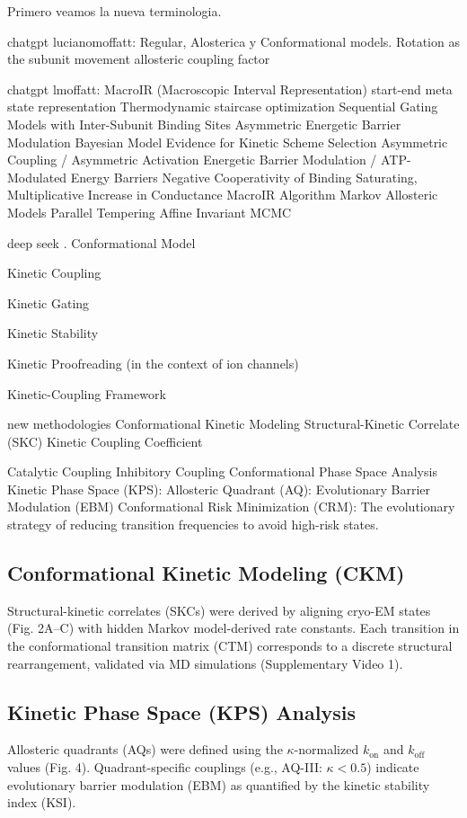 \documentclass[a4paper,12pt]{article}
\begin{document}
		
		Primero veamos la nueva terminologia. 
		
		chatgpt lucianomoffatt: 
		Regular, Alosterica y Conformational models. 
		Rotation as the subunit movement
		allosteric coupling factor
		
		chatgpt lmoffatt:
		MacroIR (Macroscopic Interval Representation)
		start-end meta state representation
		Thermodynamic staircase optimization
		Sequential Gating Models with Inter-Subunit Binding Sites
		Asymmetric Energetic Barrier Modulation
		Bayesian Model Evidence for Kinetic Scheme Selection
		Asymmetric Coupling / Asymmetric Activation
		Energetic Barrier Modulation / ATP-Modulated Energy Barriers
		Negative Cooperativity of Binding
		Saturating, Multiplicative Increase in Conductance
		MacroIR Algorithm
		Markov Allosteric Models
		Parallel Tempering Affine Invariant MCMC
		
		deep seek
		. Conformational Model
		
		Kinetic Coupling
		
		Kinetic Gating
		
		Kinetic Stability
		
		Kinetic Proofreading (in the context of ion channels)
		
		Kinetic-Coupling Framework
		
		
		new methodologies
		Conformational Kinetic Modeling
		Structural-Kinetic Correlate (SKC)
		Kinetic Coupling Coefficient 
		
		Catalytic Coupling
		Inhibitory Coupling
		Conformational Phase Space Analysis
		Kinetic Phase Space (KPS):
		Allosteric Quadrant (AQ):
		Evolutionary Barrier Modulation (EBM)
		Conformational Risk Minimization (CRM): The evolutionary strategy of reducing transition frequencies to avoid high-risk states.
		
		\subsection*{Conformational Kinetic Modeling (CKM)}  
		Structural-kinetic correlates (SKCs) were derived by aligning cryo-EM states (Fig. 2A–C) with hidden Markov model-derived rate constants. Each transition in the conformational transition matrix (CTM) corresponds to a discrete structural rearrangement, validated via MD simulations (Supplementary Video 1).  
		
		\subsection*{Kinetic Phase Space (KPS) Analysis}  
		Allosteric quadrants (AQs) were defined using the $\kappa$-normalized $k_{\text{on}}$ and $k_{\text{off}}$ values (Fig. 4). Quadrant-specific couplings (e.g., AQ-III: $\kappa < 0.5$) indicate evolutionary barrier modulation (EBM) as quantified by the kinetic stability index (KSI).  
		
\end{document}
